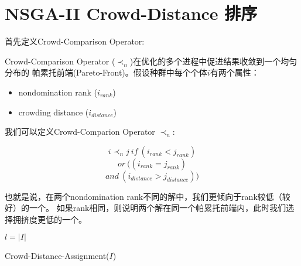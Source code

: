 
\chapter{NSGA-II Crowd-Distance 排序}
\label{sec:crowd}

首先定义Crowd-Comparison Operator:

Crowd-Comparison Operator ($\prec_{n}$)在优化的多个进程中促进结果收敛到一个均匀分布的
帕累托前端(Pareto-Front)。假设种群中每个个体$i$有两个属性：
\begin{itemize}
    \item nondomination rank ($i_{rank}$)
    \item crowding distance ($i_{distance}$)
\end{itemize}
我们可以定义Crowd-Comparion Operator $\prec_{n}$:

$$ i \prec_{n} j \ if\  (i_{rank} < j_{rank})$$
$$ or\  ( (i_{rank} = j_{rank}) $$
$$ and\  (i_{distance} > j_{distance}) )$$

也就是说，在两个nondomination rank不同的解中，我们更倾向于rank较低（较好）的一个。
如果rank相同，则说明两个解在同一个帕累托前端内，此时我们选择拥挤度更低的一个。

\begin{algorithm}
    
    $l = |I|$ 
	
	\caption{Crowd-Distance-Assignment($I$)}	
	\label{algo:crowd-distance-assign}
\end{algorithm}


